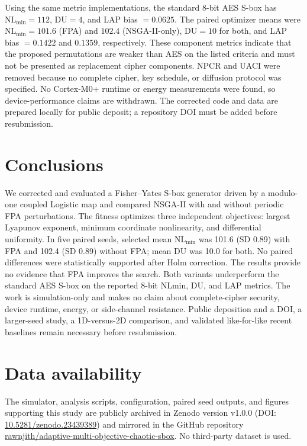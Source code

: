 \documentclass[11pt,a4paper]{article}
\begin{document}
Using the same metric implementations, the standard 8-bit AES S-box
has $\mathrm{NL}_{\min}=112$, DU$=4$, and LAP bias $=0.0625$. The
paired optimizer means were $\mathrm{NL}_{\min}=101.6$ (FPA) and
$102.4$ (NSGA-II-only), DU$=10$ for both, and LAP bias $=0.1422$ and
$0.1359$, respectively. These component metrics indicate that the
proposed permutations are weaker than AES on the listed criteria and
must not be presented as replacement cipher components. NPCR and UACI
were removed because no complete cipher, key schedule, or diffusion
protocol was specified. No Cortex-M0+ runtime or energy measurements
were found, so device-performance claims are withdrawn. The corrected
code and data are prepared locally for public deposit; a repository DOI
must be added before resubmission.

\section{Conclusions}
\label{sec:conclusions}

We corrected and evaluated a Fisher--Yates S-box generator driven by a
modulo-one coupled Logistic map and compared NSGA-II with and without
periodic FPA perturbations. The fitness optimizes three independent
objectives: largest Lyapunov exponent, minimum coordinate nonlinearity,
and differential uniformity. In five paired seeds, selected mean
$\mathrm{NL}_{\min}$ was 101.6 (SD 0.89) with FPA and 102.4 (SD 0.89)
without FPA; mean DU was 10.0 for both. No paired differences were
statistically supported after Holm correction. The results provide no
evidence that FPA improves the search. Both variants underperform the
standard AES S-box on the reported 8-bit NLmin, DU, and LAP metrics.
The work is simulation-only and makes no claim about complete-cipher
security, device runtime, energy, or side-channel resistance. Public
deposition and a DOI, a larger-seed study, a 1D-versus-2D comparison,
and validated like-for-like recent baselines remain necessary before
resubmission.

\section*{Data availability}
The simulator, analysis scripts, configuration, paired seed outputs, and
figures supporting this study are publicly archived in Zenodo version
v1.0.0 (DOI: \href{https://doi.org/10.5281/zenodo.23439389}{10.5281/zenodo.23439389})
and mirrored in the GitHub repository
\href{https://github.com/rawnjith/adaptive-multi-objective-chaotic-sbox}{rawnjith/adaptive-multi-objective-chaotic-sbox}.
No third-party dataset is used.
\end{document}
